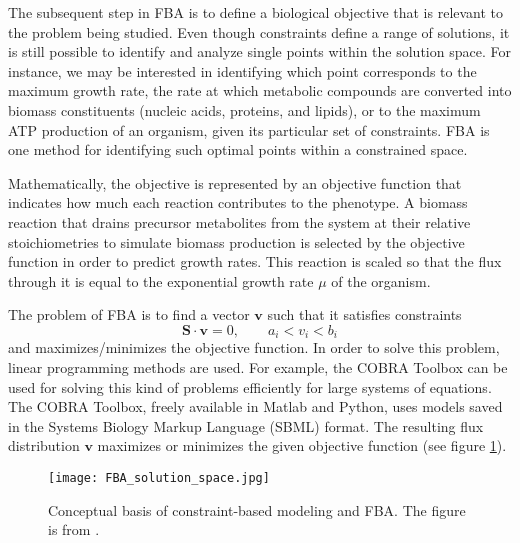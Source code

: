 
The subsequent step in FBA is to define a biological objective that is relevant to the problem being studied. Even though constraints define a range of solutions, it is still possible to identify and analyze single points within the solution space. For instance, we may be interested in identifying which point corresponds to the maximum growth rate, the rate at which metabolic compounds are converted into biomass constituents (nucleic acids, proteins, and lipids), or to the maximum ATP production of an organism, given its particular set of constraints. FBA is one method for identifying such optimal points within a constrained space. \cite{Orth2010}

Mathematically, the objective is represented by an objective function that indicates how much each reaction contributes to the phenotype. A biomass reaction that drains precursor metabolites from the system at their relative stoichiometries to simulate biomass production is selected by the objective function in order to predict growth rates. This reaction is scaled so that the flux through it is equal to the exponential growth rate $\mu$ of the organism. \cite{Orth2010}

The problem of FBA is to find a vector $\mathbf{v}$ such that it satisfies constraints
\begin{equation*}
    \mathbf{S}\cdot\mathbf{v} = 0, \qquad a_i<v_i<b_i    
\end{equation*}
and maximizes/minimizes the objective function. In order to solve this problem, linear programming methods are used. For example, the COBRA Toolbox \cite{Becker2007} can be used for solving this kind of problems efficiently for large systems of equations. The COBRA Toolbox, freely available in Matlab and Python, uses models saved in the Systems Biology Markup Language (SBML) \cite{Hucka2003} format.
The resulting flux distribution $\mathbf{v}$ maximizes or minimizes the given objective function (see figure \ref{fig:Solution_space}). \cite{Orth2010}
\begin{figure}[H]
    \texttt{[image: FBA\_solution\_space.jpg]}
    \caption{Conceptual basis of constraint-based modeling and FBA. The figure is from \cite{Orth2010}.}
    \label{fig:Solution_space}
\end{figure}

